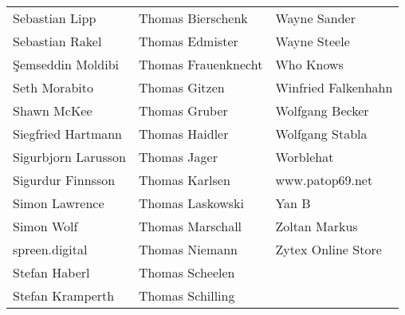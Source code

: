 \begin{tabular}{p{4.5cm}p{4.5cm}p{4.5cm}}
Sebastian Lipp & Thomas Bierschenk & Wayne Sander \\
Sebastian Rakel & Thomas Edmister & Wayne Steele \\
Şemseddin Moldibi & Thomas Frauenknecht & Who Knows \\
Seth Morabito & Thomas Gitzen & Winfried Falkenhahn \\
Shawn McKee & Thomas Gruber & Wolfgang Becker \\
Siegfried Hartmann & Thomas Haidler & Wolfgang Stabla \\
Sigurbjorn Larusson & Thomas Jager & Worblehat \\
Sigurdur Finnsson & Thomas Karlsen & www.patop69.net \\
Simon Lawrence & Thomas Laskowski & Yan B \\
Simon Wolf & Thomas Marschall & Zoltan Markus \\
spreen.digital & Thomas Niemann & Zytex Online Store \\
Stefan Haberl & Thomas Scheelen &  \\
Stefan Kramperth & Thomas Schilling &  \\
\end{tabular}
